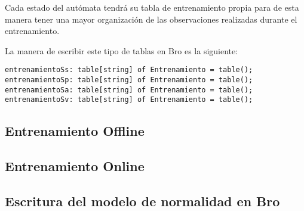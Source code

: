 Cada estado del autómata tendrá su tabla de entrenamiento propia para de esta manera tener una mayor organización de las observaciones realizadas durante el entrenamiento.

La manera de escribir este tipo de tablas en Bro es la siguiente:

\begin{verbatim}
entrenamientoSs: table[string] of Entrenamiento = table();
entrenamientoSp: table[string] of Entrenamiento = table();
entrenamientoSa: table[string] of Entrenamiento = table();
entrenamientoSv: table[string] of Entrenamiento = table();
\end{verbatim}

\subsection{Entrenamiento Offline}

\subsection{Entrenamiento Online}\label{sec:entrenamientoOffline}

\subsection{Escritura del modelo de normalidad en Bro}

